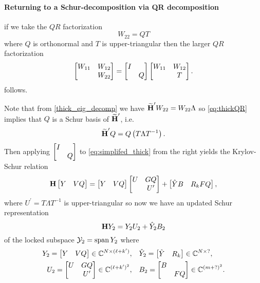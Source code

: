 \paragraph{Returning to a Schur-decomposition via QR decomposition}
if we take the $QR$ factorization  
\begin{equation}
W_{22} = Q T
\label{eq:thickQR}
\end{equation}
where $Q$ is orthonormal and $T$ is upper-triangular then the larger $QR$ factorization
\[
\begin{bmatrix} W_{11}&W_{12}\\&W_{22}\end{bmatrix} = \begin{bmatrix} I&\\&Q\end{bmatrix} \begin{bmatrix} W_{11} &W_{12}\\&T\end{bmatrix}.
\]
follows.

Note that from \eqref{thick_eig_decomp} we have $\widetilde{\textbf{\textup{H}}}^\prime W_{22} = W_{22} \Lambda$ so \eqref{eq:thickQR} implies that $Q$ is a Schur basis of $\widetilde{\textbf{\textup{H}}}^\prime$, i.e.
\[
\widetilde{\textbf{\textup{H}}}^\prime Q 
=  Q \left(T \Lambda T^{-1}\right).
\] 
Then applying $\begin{bmatrix} I&\\&Q\end{bmatrix}$ to \eqref{eq:simplifed_thick} from the right yields the Krylov-Schur relation
\begin{equation}
\textbf{\textup{H}} \begin{bmatrix} Y &VQ \end{bmatrix} =  \begin{bmatrix} Y & V Q\end{bmatrix}
\begin{bmatrix} U & G Q \\ &U^\prime\end{bmatrix} +  \begin{bmatrix} \hat{Y} B & R_k F Q\end{bmatrix},
\label{eq:simplifed_thick_deflated_qr}
\end{equation}    
where $U^\prime = T \Lambda T^{-1}$ is upper-triangular so now we have an updated Schur representation  
 \begin{equation}
\textbf{\textup{H}} Y_2 =  Y_2 U_2 + \hat{Y}_2 B_2
\end{equation}
of the locked subspace $\mathcal{Y}_2=\operatorname*{span} Y_2$ where 
\begin{align*}
Y_2 =  \begin{bmatrix} Y &V Q\end{bmatrix}\in\mathbb{C}^{N\times (\ell+k^\prime)},
&\quad  
\hat{Y}_2 =\begin{bmatrix} \hat{Y} &R_k\end{bmatrix}\in\mathbb{C}^{N\times ?},\\  
U_2 =\begin{bmatrix} U & G Q\\&U^\prime\end{bmatrix}\in\mathbb{C}^{(\ell+k^\prime)^2},
&\quad
B_2 =\begin{bmatrix} B&\\&F Q\end{bmatrix}\in\mathbb{C}^{(m+?)^2}.
\end{align*}




